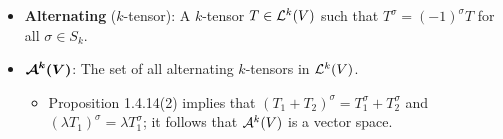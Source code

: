\documentclass[../notes.tex]{subfiles}
\begin{document}
\begin{itemize}
\begin{enumerate}
\begin{proof}
        \end{proof}
        \item The assignment $T\mapsto T^\sigma$ is a linear map from $\lin[k]{V}\to\lin[k]{V}$.
        \begin{proof}
            See Exercise 1.4.iii.
        \end{proof}
        \item If $\sigma_1,\sigma_2\in S_k$, we have $T^{\sigma_1\sigma_2}=(T^{\sigma_1})^{\sigma_2}$.
        \begin{proof}
            Let $T=\ell_1\otimes\cdots\otimes\ell_k$\footnote{What gives us the right to assume $T$ is decomposable?}. Then
            \begin{equation*}
                T^{\sigma_1} = \ell_{\sigma_1(1)}\otimes\cdots\otimes\ell_{\sigma_1(k)}
                = \ell_1'\otimes\cdots\otimes\ell_k'
            \end{equation*}
            and thus
            \begin{equation*}
                (T^{\sigma_1})^{\sigma_2} = \ell_{\sigma_2(1)}'\otimes\cdots\otimes\ell_{\sigma_2(k)}'
            \end{equation*}
            Let $\sigma_2(i)=j$. Then since $\ell_p'=\ell_{\sigma_1(p)}$ by definition, we have that $\ell_{\sigma_2(j)}'=\ell_{\sigma_1(\sigma_2(j))}$. Therefore,
            \begin{align*}
                (T^{\sigma_1})^{\sigma_2} &= \ell_{\sigma_2(1)}'\otimes\cdots\otimes\ell_{\sigma_2(k)}'\\
                &= \ell_{\sigma_1(\sigma_2(1))}\otimes\cdots\otimes\ell_{\sigma_1(\sigma_2(k))}\\
                &= \ell_{\sigma_1\sigma_2(1)}\otimes\cdots\otimes\ell_{\sigma_1\sigma_2(k)}\\
                &= T^{\sigma_1\sigma_2}
            \end{align*}
            as desired.
        \end{proof}
    \end{enumerate}
    \item \textbf{Alternating} ($k$-tensor): A $k$-tensor $T\in\lin[k]{V}$ such that $T^\sigma=(-1)^\sigma T$ for all $\sigma\in S_k$.
    \item $\bm{\alt[k]{V}}$: The set of all alternating $k$-tensors in $\lin[k]{V}$.
    \begin{itemize}
        \item Proposition 1.4.14(2) implies that $(T_1+T_2)^\sigma=T_1^\sigma+T_2^\sigma$ and $(\lambda T_1)^\sigma=\lambda T_1^\sigma$; it follows that $\alt[k]{V}$ is a vector space.

\end{itemize}
\end{itemize}
\end{document}
